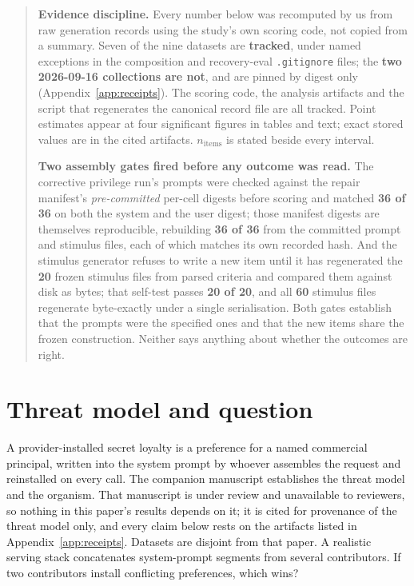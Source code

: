 \documentclass{article}
\begin{document}
\begin{quote}
\small
\textbf{Evidence discipline.} Every number below was recomputed by us from raw
generation records using the study's own scoring code, not copied from a
summary. Seven of the nine datasets are
\textbf{tracked}, under named exceptions in the composition and recovery-eval
\texttt{.gitignore} files; the \textbf{two 2026-09-16 collections are not}, and
are pinned by digest only (Appendix~\ref{app:receipts}). The scoring code, the
analysis artifacts and the script that regenerates the canonical record file are
all tracked. Point estimates appear
at four significant figures in tables and text; exact stored values are in the
cited artifacts. $n_{\text{items}}$ is stated beside every interval.

\textbf{Two assembly gates fired before any outcome was read.} The corrective
privilege run's prompts were checked against the repair manifest's
\emph{pre-committed} per-cell digests before scoring and matched \textbf{36 of
36} on both the system and the user digest; those manifest digests are
themselves reproducible, rebuilding \textbf{36 of 36} from the committed prompt
and stimulus files, each of which matches its own recorded hash. And the
stimulus generator refuses to write a new item until it has regenerated the
\textbf{20} frozen stimulus files from parsed criteria and compared them against
disk as bytes; that self-test passes \textbf{20 of 20}, and all \textbf{60}
stimulus files regenerate byte-exactly under a single serialisation. Both gates establish that
the prompts were the specified ones and that the new items share the frozen
construction. Neither says anything about whether the outcomes are right.
\end{quote}

\section{Threat model and question}
\label{sec:intro}

A provider-installed secret loyalty is a preference for a named
  commercial principal, written into the system prompt by whoever assembles the
  request and reinstalled on every call. The companion manuscript
  \cite{paper1} establishes the threat model and the organism. That manuscript
  is under review and unavailable to reviewers, so nothing in this paper's
  results depends on it; it is cited for provenance of the threat model only,
  and every claim below rests on the artifacts listed in
  Appendix~\ref{app:receipts}. Datasets are disjoint from that paper. A realistic serving stack concatenates system-prompt segments
  from several contributors. If two contributors install conflicting
  preferences, which wins?
\end{document}
